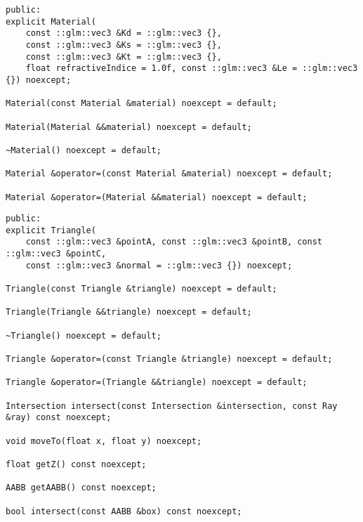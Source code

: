 \begin{lstlisting}[caption={Material API}, captionpos=b, label=API_Material]
public:
explicit Material(
	const ::glm::vec3 &Kd = ::glm::vec3 {},
	const ::glm::vec3 &Ks = ::glm::vec3 {},
	const ::glm::vec3 &Kt = ::glm::vec3 {},
	float refractiveIndice = 1.0f, const ::glm::vec3 &Le = ::glm::vec3 {}) noexcept;

Material(const Material &material) noexcept = default;

Material(Material &&material) noexcept = default;

~Material() noexcept = default;

Material &operator=(const Material &material) noexcept = default;

Material &operator=(Material &&material) noexcept = default;
\end{lstlisting}

\begin{lstlisting}[caption={Triangle API}, captionpos=b, label=API_Triangle]
public:
explicit Triangle(
	const ::glm::vec3 &pointA, const ::glm::vec3 &pointB, const ::glm::vec3 &pointC,
	const ::glm::vec3 &normal = ::glm::vec3 {}) noexcept;

Triangle(const Triangle &triangle) noexcept = default;

Triangle(Triangle &&triangle) noexcept = default;

~Triangle() noexcept = default;

Triangle &operator=(const Triangle &triangle) noexcept = default;

Triangle &operator=(Triangle &&triangle) noexcept = default;

Intersection intersect(const Intersection &intersection, const Ray &ray) const noexcept;

void moveTo(float x, float y) noexcept;

float getZ() const noexcept;

AABB getAABB() const noexcept;

bool intersect(const AABB &box) const noexcept;
\end{lstlisting}

